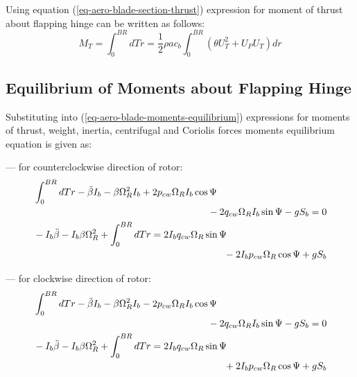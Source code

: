 Using equation (\ref{eq-aero-blade-section-thrust}) expression for moment of thrust about flapping hinge can be written as follows:
\begin{equation}
  M_T =
  \int_{0}^{BR} dT r = 
  \frac{1}{2} \rho a c_b
  \int_{0}^{BR} \left( \theta U_T^2 + U_P U_T \right) dr
\end{equation}

\subsection{Equilibrium of Moments about Flapping Hinge}

Substituting into (\ref{eq-aero-blade-moments-equilibrium}) expressions for moments of thrust, weight, inertia, centrifugal and Coriolis forces moments equilibrium equation is given as:

--- for counterclockwise direction of rotor:
\begin{gather}
  \begin{multlined}[0.88\textwidth]
    \int_{0}^{BR} dT r
    - \ddot \beta I_b
    - \beta \Omega_R^2 I_b
    + 2 p_{cw} \Omega_R I_b \cos \Psi \\
    - 2 q_{cw} \Omega_R I_b \sin \Psi
    - g S_b
    = 0
  \end{multlined}
  \\
  \begin{multlined}[0.88\textwidth]
    \label{eq-aero-equilibrium-blade-moments-ccw-1}
    - I_b \ddot \beta
    - I_b \beta \Omega_R^2
    + \int_{0}^{BR} dT r
    = 2 I_b q_{cw} \Omega_R \sin \Psi \\
    - 2 I_b p_{cw} \Omega_R \cos \Psi
    + g S_b
  \end{multlined}
\end{gather}
  
--- for clockwise direction of rotor:
\begin{gather}
  \begin{multlined}[0.88\textwidth]
    \int_{0}^{BR} dT r
    - \ddot \beta I_b
    - \beta \Omega_R^2 I_b
    - 2 p_{cw} \Omega_R I_b \cos \Psi \\
    - 2 q_{cw} \Omega_R I_b \sin \Psi
    - g S_b
    = 0
  \end{multlined}
  \\
  \begin{multlined}[0.88\textwidth]
    \label{eq-aero-equilibrium-blade-moments-cw-1}
    - I_b \ddot \beta
    - I_b \beta \Omega_R^2
    + \int_{0}^{BR} dT r
    = 2 I_b q_{cw} \Omega_R \sin \Psi \\
    + 2 I_b p_{cw} \Omega_R \cos \Psi
    + g S_b
  \end{multlined}
\end{gather}

